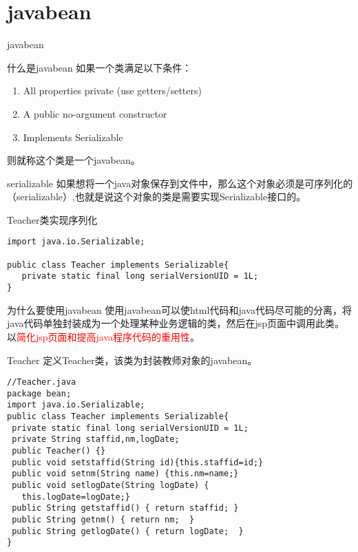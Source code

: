 \documentclass{beamer}
\begin{document}
\section{javabean}
\begin{frame}
\Huge{\centerline{javabean}}
\end{frame}
\begin{frame}{什么是javabean}
如果一个类满足以下条件：
\begin{enumerate}
\item
All properties private (use getters/setters)
\item
A public no-argument constructor
\item
Implements Serializable
\end{enumerate}
则就称这个类是一个javabean。
\end{frame}
\begin{frame}[fragile]{serializable}
如果想将一个java对象保存到文件中，那么这个对象必须是可序列化的（serializable）,也就是说这个对象的类是需要实现Serializable接口的。
\begin{block}{Teacher类实现序列化}
\begin{lstlisting}
import java.io.Serializable;

public class Teacher implements Serializable{
   private static final long serialVersionUID = 1L;
}
\end{lstlisting}
\end{block}
\end{frame}
\begin{frame}{为什么要使用javabean}
使用javabean可以使html代码和java代码尽可能的分离，将java代码单独封装成为一个处理某种业务逻辑的类，然后在jsp页面中调用此类。以\textcolor{red}{简化jsp页面和提高java程序代码的重用性}。
\end{frame}
\begin{frame}[fragile]{Teacher}
定义Teacher类，该类为封装教师对象的javabean。
\begin{lstlisting}
//Teacher.java
package bean;
import java.io.Serializable;
public class Teacher implements Serializable{
 private static final long serialVersionUID = 1L;
 private String staffid,nm,logDate;	
 public Teacher() {}
 public void setstaffid(String id){this.staffid=id;}
 public void setnm(String name) {this.nm=name;}
 public void setlogDate(String logDate) {
   this.logDate=logDate;}
 public String getstaffid() { return staffid; }
 public String getnm() { return nm;  }
 public String getlogDate() { return logDate;  }
}
\end{lstlisting}

\end{frame}
\end{document}
